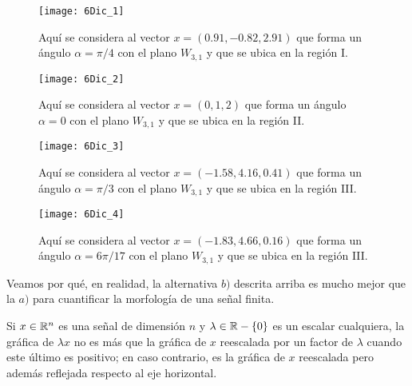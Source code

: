 \begin{ejemplo}
\begin{figure}[H]
\centering\captionsetup{format = hang}
	\begin{measuredfigure}
		\texttt{[image: 6Dic\_1]} 
		\caption{Aquí se considera al vector 
		$x=(0.91,-0.82,2.91)$ que forma un ángulo $\alpha=\pi/4$
		con el plano $W_{3,1}$ y que se ubica en la región I.}
 	\end{measuredfigure}
 \end{figure}
 
 
\begin{figure}[H]
\centering\captionsetup{format = hang}
	\begin{measuredfigure}
		\texttt{[image: 6Dic\_2]} 
		\caption{Aquí se considera al vector 
		$x=(0,1,2)$ que forma un ángulo $\alpha=0$
		con el plano $W_{3,1}$ y que se ubica en la región II.}
 	\end{measuredfigure}
 \end{figure}

\begin{figure}[H]
\centering\captionsetup{format = hang}
	\begin{measuredfigure}
		\texttt{[image: 6Dic\_3]} 
		\caption{Aquí se considera al vector
		$x=(-1.58,4.16,0.41)$ que forma un ángulo $\alpha=\pi/3$
		con el plano $W_{3,1}$ y que se ubica en la región III.}
 	\end{measuredfigure}
 \end{figure}
 
 
\begin{figure}[H]
\centering\captionsetup{format = hang}
	\begin{measuredfigure}
		\texttt{[image: 6Dic\_4]} 
		\caption{Aquí se considera al vector 
		$x=(-1.83,4.66,0.16)$ que forma un ángulo $\alpha=6\pi/17$
		con el plano $W_{3,1}$ y que se ubica en la región III.}
 	\end{measuredfigure}
 \end{figure}
 
 

Veamos por qué, en realidad, la alternativa $b)$
descrita arriba es mucho mejor que la $a)$ para cuantificar 
la morfología de una señal finita.

Si $x \in \mathbb{R}^{n}$ es una señal de dimensión $n$ y 
$\lambda \in \mathbb{R}-\{ 0 \}$ es un escalar cualquiera,
la gráfica de $\lambda x$ no es más que la gráfica 
de $x$ reescalada por un factor de $\lambda$ cuando este
último es positivo; en caso contrario, es la gráfica
de $x$ reescalada pero además reflejada respecto al eje
horizontal.


\final
\end{ejemplo}
